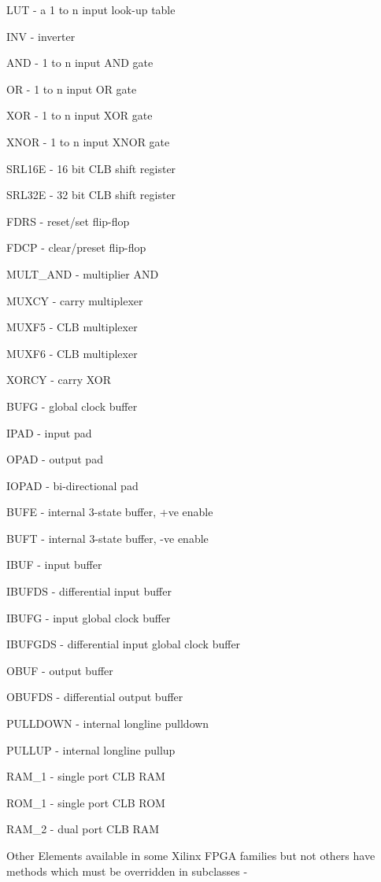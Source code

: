 \blist
\item   LUT - a 1 to n input look-up table
\item   INV - inverter
\item   AND - 1 to n input AND gate
\item   OR - 1 to n input OR gate
\item   XOR - 1 to n input XOR gate
\item   XNOR - 1 to n input XNOR gate
\item   SRL16E - 16 bit CLB shift register
\item   SRL32E - 32 bit CLB shift register
\item   FDRS - reset/set flip-flop
\item   FDCP - clear/preset flip-flop
\item   MULT\_AND - multiplier AND
\item   MUXCY - carry multiplexer
\item   MUXF5 - CLB multiplexer
\item   MUXF6 - CLB multiplexer
\item   XORCY - carry XOR
\item   BUFG - global clock buffer
\item   IPAD - input pad
\item   OPAD - output pad
\item   IOPAD - bi-directional pad
\item   BUFE - internal 3-state buffer, +ve enable
\item   BUFT - internal 3-state buffer, -ve enable
\item   IBUF - input buffer
\item   IBUFDS - differential input buffer
\item   IBUFG - input global clock buffer
\item   IBUFGDS - differential input global clock buffer
\item   OBUF - output buffer
\item   OBUFDS - differential output buffer
\item   PULLDOWN - internal longline pulldown
\item   PULLUP - internal longline pullup
\item   RAM\_1 - single port CLB RAM
\item   ROM\_1 - single port CLB ROM
\item   RAM\_2 - dual port CLB RAM
\blend

Other Elements available in some Xilinx FPGA families but not others
have methods which must be overridden in subclasses -

